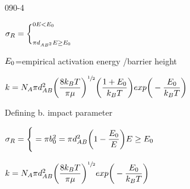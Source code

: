 \begin{mitframe}{090-4}
\item $\molecrad_{\gasconst}=\bigg\{_{\pi{d}_{\helmholtz\exergy^2}\energy\geq\energy_{\init}}^{0 \energy<\energy_{\init}}$
	\begin{listtwo}
    	\item $\energy_{\init}$=empirical activation energy /barrier height
        \item $\thermcond=\nummoles_{\helmholtz}\pi{d}_{\helmholtz\exergy}^2\bigg(\dfrac{8\thermcond_{\exergy}\Temp}{\pi\chempot}\bigg)^{\sfrac{1}{2}}\bigg(\dfrac{1+\energy_{\init}}{\thermcond_{\exergy}\Temp}\bigg)exp\bigg(-\dfrac{\energy_{\init}}{\thermcond_{\exergy}\Temp}\bigg)$
        	\begin{listthree}
            	\item Defining b. impact parameter
                \item $\molecrad_{\gasconst}=\Bigg\{=\pi{b}_{\init}^2=\pi{d}_{\helmholtz\exergy}^2\bigg(1-\dfrac{\energy_{\init}}{\energy}\bigg)\energy\geq\energy_{\init}$
                	\begin{listfour}
                    	\item $\thermcond=\nummoles_{\helmholtz}\pi{d}_{\helmholtz\exergy}^2\bigg(\dfrac{8\thermcond_{\exergy}\Temp}{\pi\chempot}\bigg)^{\sfrac{1}{2}}exp\bigg(-\dfrac{\energy_{\init}}{\thermcond_{\exergy}\Temp}\bigg)$
                    \end{listfour}
            \end{listthree}
    \end{listtwo}
\end{mitframe}
